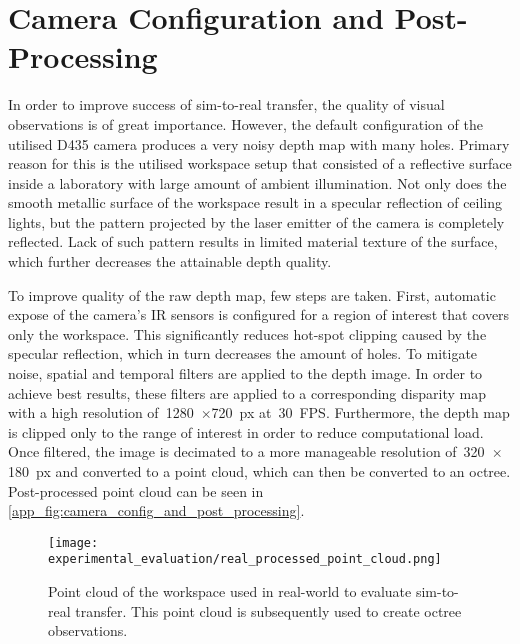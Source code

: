 \section{Camera Configuration and Post-Processing}\label{app:camera_configuration_and_postprocessing}

In order to improve success of sim-to-real transfer, the quality of visual observations is of great importance. However, the default configuration of the utilised D435 camera produces a very noisy depth map with many holes. Primary reason for this is the utilised workspace setup that consisted of a reflective surface inside a laboratory with large amount of ambient illumination. Not only does the smooth metallic surface of the workspace result in a specular reflection of ceiling lights, but the pattern projected by the laser emitter of the camera is completely reflected. Lack of such pattern results in limited material texture of the surface, which further decreases the attainable depth quality.

To improve quality of the raw depth map, few steps are taken. First, automatic expose of the camera's IR sensors is configured for a region of interest that covers only the workspace. This significantly reduces hot-spot clipping caused by the specular reflection, which in turn decreases the amount of holes. To mitigate noise, spatial and temporal filters are applied to the depth image. In order to achieve best results, these filters are applied to a corresponding disparity map with a high resolution of~1280~\(\times\)720~px at~30~FPS. Furthermore, the depth map is clipped only to the range of interest in order to reduce computational load. Once filtered, the image is decimated to a more manageable resolution of~320~\(\times\)180~px and converted to a point cloud, which can then be converted to an octree. Post-processed point cloud can be seen in \autoref{app_fig:camera_config_and_post_processing}.

\setcounter{figure}{0}
\begin{figure}[ht]
    \centering
    \texttt{[image: experimental\_evaluation/real\_processed\_point\_cloud.png]}
    \caption{Point cloud of the workspace used in real-world to evaluate sim-to-real transfer. This point cloud is subsequently used to create octree observations.}
    \label{app_fig:camera_config_and_post_processing}
\end{figure}
